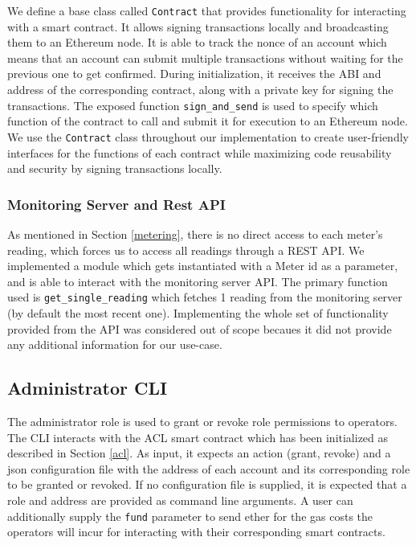 We define a base class called \texttt{Contract} that provides functionality for interacting  with a smart contract. It allows signing transactions locally and broadcasting them to an Ethereum node. It is able to track the nonce of an account which means that an account can submit multiple transactions without waiting for the previous one to get confirmed. During initialization, it receives the ABI and address of the corresponding contract, along with a private key for signing the transactions. The exposed function \texttt{sign\_and\_send} is used to specify which function of the contract to call and submit it for execution to an Ethereum node. We use the \texttt{Contract} class throughout our implementation to create user-friendly interfaces for the functions of each contract while maximizing code reusability and security by signing transactions locally.

\subsubsection*{Monitoring Server and Rest API}
As mentioned in Section \ref{metering}, there is no direct access to each meter's reading, which forces us to access all readings through a REST API. We implemented a module which gets instantiated with a Meter id as a parameter, and is able to interact with the monitoring server API. The primary function used is \texttt{get\_single\_reading} which fetches 1 reading from the monitoring server (by default the most recent one). Implementing the whole set of functionality provided from the API was considered out of scope becaues it did not provide any additional information for our use-case.

\subsection{Administrator CLI}
The administrator role is used to grant or revoke role permissions to operators. The CLI interacts with the ACL smart contract which has been initialized as described in Section \ref{acl}.  As input, it expects an action (grant, revoke) and a json configuration file with the address of each account and its corresponding role to be granted or revoked. If no configuration file is supplied, it is expected that a role and address are provided as command line arguments. A user can additionally supply the \texttt{fund} parameter to send ether for the gas costs the operators will incur for interacting with their corresponding smart contracts. 

